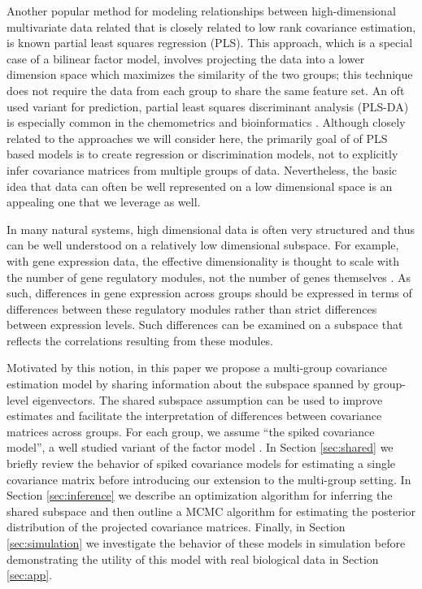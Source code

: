 \documentclass{article}
\begin{document}

Another popular method for modeling relationships between
high-dimensional multivariate data related that is closely related to
low rank covariance estimation, is known partial least squares
regression (PLS). This approach, which is a special case of a bilinear
factor model, involves projecting the data into a lower dimension
space which maximizes the similarity of the two groups; this technique
does not require the data from each group to share the same feature
set.  An oft used variant for prediction, partial least squares discriminant analysis
(PLS-DA) is especially common in the chemometrics and bioinformatics
 \citep{Barker2003} .  Although closely related to
the approaches we will consider here, the primarily goal of of PLS based models
is to create regression or discrimination models, not to explicitly
infer covariance matrices from multiple groups of data.  Nevertheless,
the basic idea that data can often be well represented on a low
dimensional space is an appealing one that we leverage as well.

In many natural systems, high dimensional data is often very
structured and thus can be well understood on a relatively low
dimensional subspace. For example, with gene expression data, the
effective dimensionality is thought to scale with the number of gene
regulatory modules, not the number of genes themselves
\citep{Heimberg2016}.  As such, differences in gene expression across
groups should be expressed in terms of differences between these
regulatory modules rather than strict differences between expression
levels.  Such differences can be examined on a subspace that reflects
the correlations resulting from these modules.

Motivated by this notion, in this paper we propose a multi-group
covariance estimation model by sharing information about the subspace
spanned by group-level eigenvectors.  The shared subspace assumption
can be used to improve estimates and facilitate the interpretation of
differences between covariance matrices across groups.  For each
group, we assume ``the spiked covariance model'', a well studied
variant of the factor model \citep{Johnstone2001}.  In Section
\ref{sec:shared} we briefly review the behavior of spiked covariance
models for estimating a single covariance matrix before introducing
our extension to the multi-group setting.  In Section
\ref{sec:inference} we describe an optimization algorithm for
inferring the shared subspace and then outline a MCMC algorithm for
estimating the posterior distribution of the projected covariance
matrices.  Finally, in Section \ref{sec:simulation} we investigate the
behavior of these models in simulation before demonstrating the
utility of this model with real biological data in Section
\ref{sec:app}.
\end{document}
